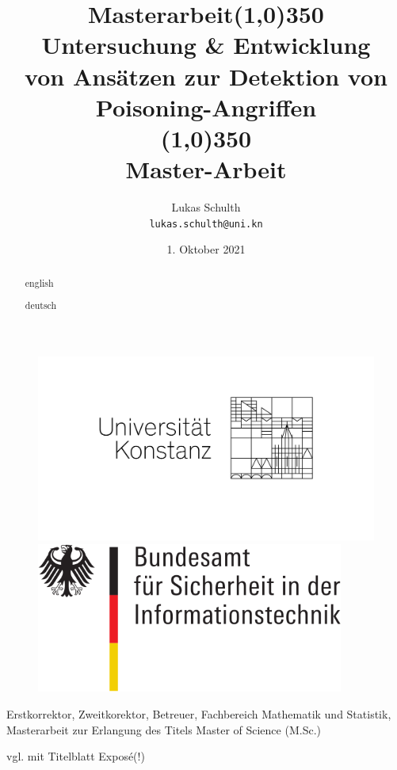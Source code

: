 \documentclass[twoside, 12pt,a4paper]{article}
\title{Masterarbeit}
\title{\line(1,0){350}\\Untersuchung \& Entwicklung \\von Ansätzen zur Detektion von Poisoning-Angriffen\\\line(1,0){350}\\
	Master-Arbeit}
\author{
	Lukas Schulth\\
	\texttt{lukas.schulth@uni.kn}
}
\date{1. Oktober 2021}
\numberwithin{equation}{section}
\begin{document}
	\begin{titlepage}
		
		
		
		\thispagestyle{empty} 
		\begin{figure}
			\centering
			\begin{minipage}{0.45\textwidth}
				\centering
				\includegraphics[width=1.2\textwidth]{logounikn} %
				
			\end{minipage}\hfill
			\begin{minipage}{0.45\textwidth}
				\centering
				\includegraphics[width=0.9\textwidth]{bsi_logo} %
			
			\end{minipage}
		\end{figure}
	\maketitle
	
	Erstkorrektor, Zweitkorektor, Betreuer, Fachbereich Mathematik und Statistik, Masterarbeit zur Erlangung des Titels Master of Science (M.Sc.)
	
	vgl. mit Titelblatt Exposé(!)
	
	\end{titlepage}
	\begin{abstract}english\end{abstract}
	\begin{abstract}deutsch\end{abstract}
\end{document}
